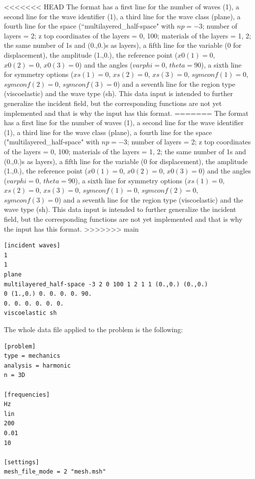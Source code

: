 \documentclass[a4]{article}
\begin{document}
\begin{itemize}
<<<<<<< HEAD
The format has a first line for the number of waves (1), a second line for the wave identifier (1), a third line for the wave class (plane), a fourth line for the space (``multilayered\_half-space" with $np = -3$; number of layers = 2; z top coordinates of the layers = 0, 100; materials of the layers = 1, 2; the same number of 1s and (0.,0.)s as layers), a fifth line for the variable (0 for displacement), the amplitude (1.,0.), the reference point ($ x0(1) = 0 $, $ x0(2) = 0 $, $ x0(3) = 0 $)  and the angles ($ varphi = 0 $, $ theta = 90 $), a sixth line for symmetry options ($ xs(1) = 0 $, $ xs(2) = 0 $, $ xs(3) = 0 $, $ symconf(1) = 0 $, $ symconf(2) = 0 $, $ symconf(3) = 0 $) and a seventh line for the region type (viscoelastic) and the wave type (sh). This data input is intended to further generalize the incident field, but the corresponding functions are not yet implemented and that is why the input has this format. 
=======
The format has a first line for the number of waves (1), a second line for the wave identifier (1), a third line for the wave class (plane), a fourth line for the space ("multilayered\_half-space" with $np = -3$; number of layers = 2; z top coordinates of the layers = 0, 100; materials of the layers = 1, 2; the same number of 1s and (0.,0.)s as layers), a fifth line for the variable (0 for displacement), the amplitude (1.,0.), the reference point ($ x0(1) = 0 $, $ x0(2) = 0 $, $ x0(3) = 0 $)  and the angles ($ varphi = 0 $, $ theta = 90 $), a sixth line for symmetry options ($ xs(1) = 0 $, $ xs(2) = 0 $, $ xs(3) = 0 $, $ symconf(1) = 0 $, $ symconf(2) = 0 $, $ symconf(3) = 0 $) and a seventh line for the region type (viscoelastic) and the wave type (sh). This data input is intended to further generalize the incident field, but the corresponding functions are not yet implemented and that is why the input has this format. 
>>>>>>> main

\begin{Verbatim}
[incident waves]
1
1
plane
multilayered_half-space -3 2 0 100 1 2 1 1 (0.,0.) (0.,0.)
0 (1.,0.) 0. 0. 0. 0. 90.
0. 0. 0. 0. 0. 0.
viscoelastic sh
\end{Verbatim}

The whole data file applied to the problem is the following:

\begin{Verbatim}
[problem]
type = mechanics
analysis = harmonic
n = 3D

[frequencies]
Hz
lin
200
0.01
10

[settings]
mesh_file_mode = 2 "mesh.msh"


\end{Verbatim}
\end{itemize}
\end{document}
